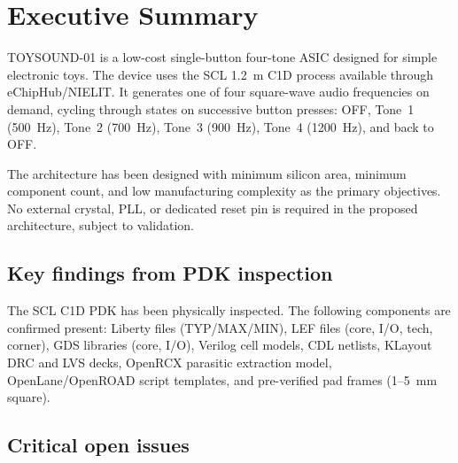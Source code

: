 \documentclass[11pt,a4paper]{article}
\begin{document}
\tableofcontents
\newpage

\section{Executive Summary}

TOYSOUND-01 is a low-cost single-button four-tone ASIC designed for simple electronic toys.
The device uses the SCL 1.2~\textmu m C1D process available through eChipHub/NIELIT.
It generates one of four square-wave audio frequencies on demand, cycling through states
on successive button presses: OFF, Tone~1 (500~Hz), Tone~2 (700~Hz), Tone~3 (900~Hz),
Tone~4 (1200~Hz), and back to OFF.

The architecture has been designed with minimum silicon area, minimum component count, and
low manufacturing complexity as the primary objectives. No external crystal, PLL, or dedicated
reset pin is required in the proposed architecture, subject to validation.

\subsection*{Key findings from PDK inspection}

The SCL C1D PDK has been physically inspected. The following components are confirmed present:
Liberty files (TYP/MAX/MIN), LEF files (core, I/O, tech, corner), GDS libraries (core, I/O),
Verilog cell models, CDL netlists, KLayout DRC and LVS decks, OpenRCX parasitic extraction model,
OpenLane/OpenROAD script templates, and pre-verified pad frames (1--5~mm square).

\subsection*{Critical open issues}
\end{document}
